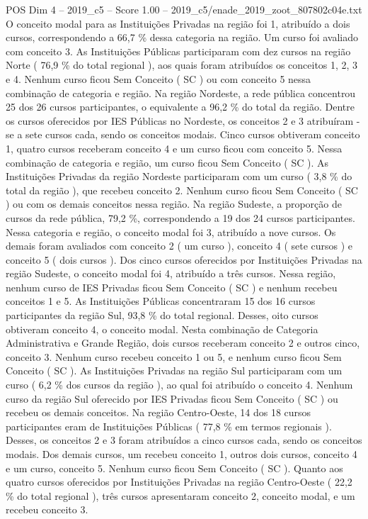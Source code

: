 \begin{textsample}{POS Dim 4 – 2019\_c5 – Score 1.00 – 2019\_c5/enade\_2019\_zoot\_807802c04e.txt}
O conceito modal para as Instituições Privadas na região foi 1, atribuído a dois cursos, correspondendo a 66,7 \% dessa categoria na região.
Um curso foi avaliado com conceito 3.
As Instituições Públicas participaram com dez cursos na região Norte ( 76,9 \% do total regional ), aos quais foram atribuídos os conceitos 1, 2, 3 e 4.
Nenhum curso ficou Sem Conceito ( SC ) ou com conceito 5 nessa combinação de categoria e região.
Na região Nordeste, a rede pública concentrou 25 dos 26 cursos participantes, o equivalente a 96,2 \% do total da região.
Dentre os cursos oferecidos por IES Públicas no Nordeste, os conceitos 2 e 3 atribuíram -se a sete cursos cada, sendo os conceitos modais.
Cinco cursos obtiveram conceito 1, quatro cursos receberam conceito 4 e um curso ficou com conceito 5.
Nessa combinação de categoria e região, um curso ficou Sem Conceito ( SC ).
As Instituições Privadas da região Nordeste participaram com um curso ( 3,8 \% do total da região ), que recebeu conceito 2.
Nenhum curso ficou Sem Conceito ( SC ) ou com os demais conceitos nessa região.
Na região Sudeste, a proporção de cursos da rede pública, 79,2 \%, correspondendo a 19 dos 24 cursos participantes.
Nessa categoria e região, o conceito modal foi 3, atribuído a nove cursos.
Os demais foram avaliados com conceito 2 ( um curso ), conceito 4 ( sete cursos ) e conceito 5 ( dois cursos ).
Dos cinco cursos oferecidos por Instituições Privadas na região Sudeste, o conceito modal foi 4, atribuído a três cursos.
Nessa região, nenhum curso de IES Privadas ficou Sem Conceito ( SC ) e nenhum recebeu conceitos 1 e 5.
As Instituições Públicas concentraram 15 dos 16 cursos participantes da região Sul, 93,8 \% do total regional.
Desses, oito cursos obtiveram conceito 4, o conceito modal.
Nesta combinação de Categoria Administrativa e Grande Região, dois cursos receberam conceito 2 e outros cinco, conceito 3.
Nenhum curso recebeu conceito 1 ou 5, e nenhum curso ficou Sem Conceito ( SC ).
As Instituições Privadas na região Sul participaram com um curso ( 6,2 \% dos cursos da região ), ao qual foi atribuído o conceito 4.
Nenhum curso da região Sul oferecido por IES Privadas ficou Sem Conceito ( SC ) ou recebeu os demais conceitos.
Na região Centro-Oeste, 14 dos 18 cursos participantes eram de Instituições Públicas ( 77,8 \% em termos regionais ).
Desses, os conceitos 2 e 3 foram atribuídos a cinco cursos cada, sendo os conceitos modais.
Dos demais cursos, um recebeu conceito 1, outros dois cursos, conceito 4 e um curso, conceito 5.
Nenhum curso ficou Sem Conceito ( SC ).
Quanto aos quatro cursos oferecidos por Instituições Privadas na região Centro-Oeste ( 22,2 \% do total regional ), três cursos apresentaram conceito 2, conceito modal, e um recebeu conceito 3.

\end{textsample}
